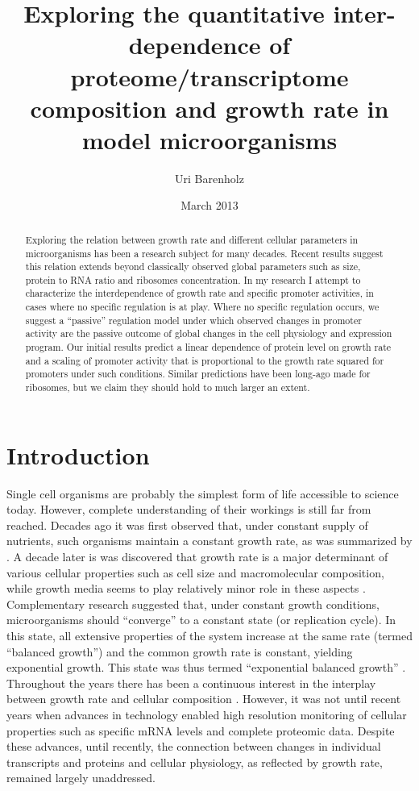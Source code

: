 \documentclass[a4page,notitlepage]{article}
\title{Exploring the quantitative inter-dependence of proteome/transcriptome composition and growth rate in model microorganisms}
\author{Uri Barenholz}
\date{March 2013}
\begin{document}
\maketitle
\begin{abstract}
Exploring the relation between growth rate and different cellular parameters in microorganisms has been a research subject for many decades.
Recent results suggest this relation extends beyond classically observed global parameters such as size, protein to RNA ratio and ribosomes concentration.
In my research I attempt to characterize the interdependence of growth rate and specific promoter activities, in cases where no specific regulation is at play.
Where no specific regulation occurs, we suggest a ``passive'' regulation model under which observed changes in promoter activity are the passive outcome of global changes in the cell physiology and expression program.
Our initial results predict a linear dependence of protein level on growth rate and a scaling of promoter activity that is proportional to the growth rate squared for promoters under such conditions.
Similar predictions have been long-ago made for ribosomes, but we claim they should hold to much larger an extent.
\end{abstract}
\clearpage
\tableofcontents

\section{Introduction}
Single cell organisms are probably the simplest form of life accessible to science today.
However, complete understanding of their workings is still far from reached.
Decades ago it was first observed that, under constant supply of nutrients, such organisms maintain a constant growth rate, as was summarized by \parencite{Monod1949}.
A decade later is was discovered that growth rate is a major determinant of various cellular properties such as cell size and macromolecular composition, while growth media seems to play relatively minor role in these aspects \parencite{Schaechter1958}.
Complementary research suggested that, under constant growth conditions, microorganisms should ``converge'' to a constant state (or replication cycle).
In this state, all extensive properties of the system increase at the same rate (termed ``balanced growth'') and the common growth rate is constant, yielding exponential growth.
This state was thus termed ``exponential balanced growth'' \parencite{Campbell1957}.
Throughout the years there has been a continuous interest in the interplay between growth rate and cellular composition \parencite{Maaloe1969, Pedersen1978a, Bremer1987}.
However, it was not until recent years when advances in technology enabled high resolution monitoring of cellular properties such as specific mRNA levels and complete proteomic data.
Despite these advances, until recently, the connection between changes in individual transcripts and proteins and cellular physiology, as reflected by growth rate, remained largely unaddressed.
\end{document}
